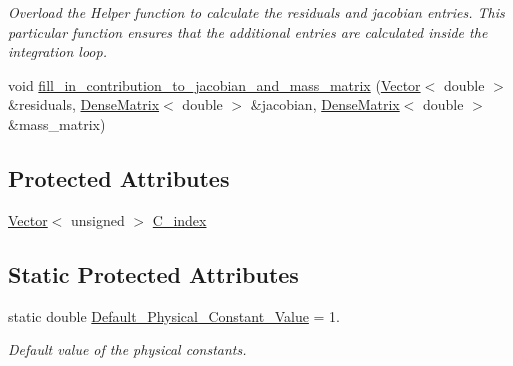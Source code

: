 \begin{DoxyCompactItemize}
\begin{DoxyCompactList}\small\item\em Overload the Helper function to calculate the residuals and jacobian entries. This particular function ensures that the additional entries are calculated inside the integration loop. \end{DoxyCompactList}\item 
void \hyperlink{classoomph_1_1SurfactantTransportInterfaceElement_a7c0f9b63cea887a4a65abbe9aeb3b3cf}{fill\+\_\+in\+\_\+contribution\+\_\+to\+\_\+jacobian\+\_\+and\+\_\+mass\+\_\+matrix} (\hyperlink{classoomph_1_1Vector}{Vector}$<$ double $>$ \&residuals, \hyperlink{classoomph_1_1DenseMatrix}{Dense\+Matrix}$<$ double $>$ \&jacobian, \hyperlink{classoomph_1_1DenseMatrix}{Dense\+Matrix}$<$ double $>$ \&mass\+\_\+matrix)
\end{DoxyCompactItemize}
\subsection*{Protected Attributes}
\begin{DoxyCompactItemize}
\item 
\hyperlink{classoomph_1_1Vector}{Vector}$<$ unsigned $>$ \hyperlink{classoomph_1_1SurfactantTransportInterfaceElement_a26727fb7b57f88d3e1bdf4f2dd9f3b02}{C\+\_\+index}
\end{DoxyCompactItemize}
\subsection*{Static Protected Attributes}
\begin{DoxyCompactItemize}
\item 
static double \hyperlink{classoomph_1_1SurfactantTransportInterfaceElement_ae2c6f40fd7bc427636ac25c23d816e74}{Default\+\_\+\+Physical\+\_\+\+Constant\+\_\+\+Value} = 1.
\begin{DoxyCompactList}\small\item\em Default value of the physical constants. \end{DoxyCompactList}\end{DoxyCompactItemize}
